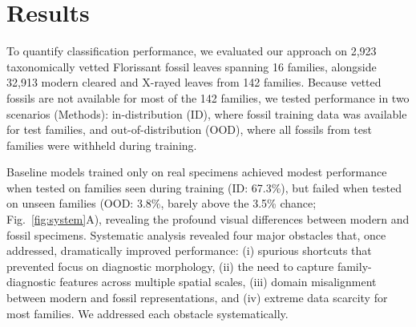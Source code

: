 \documentclass[pdflatex,lineno,sn-nature]{sn-jnl}%
\theoremstyle{plain}%
\theoremstyle{definition}%
\theoremstyle{remark}%
\begin{document}
\section*{Results}

To quantify classification performance, we evaluated our approach on 2,923 taxonomically vetted Florissant fossil leaves spanning 16 families, alongside 32,913 modern cleared and X-rayed leaves from 142 families. Because vetted fossils are not available for most of the 142 families, we tested performance in two scenarios (Methods): in-distribution (ID), where fossil training data was available for test families, and out-of-distribution (OOD), where all fossils from test families were withheld during training. 

Baseline models trained only on real specimens achieved modest performance when tested on families seen during training (ID: 67.3\%), but failed when tested on unseen families (OOD: 3.8\%, barely above the 3.5\% chance; Fig.~\ref{fig:system}A), revealing the profound visual differences between modern and fossil specimens. Systematic analysis revealed four major obstacles that, once addressed, dramatically improved performance: (i) spurious shortcuts that prevented focus on diagnostic morphology, (ii) the need to capture family-diagnostic features across multiple spatial scales, (iii) domain misalignment between modern and fossil representations, and (iv) extreme data scarcity for most families. We addressed each obstacle systematically.



\end{document}
